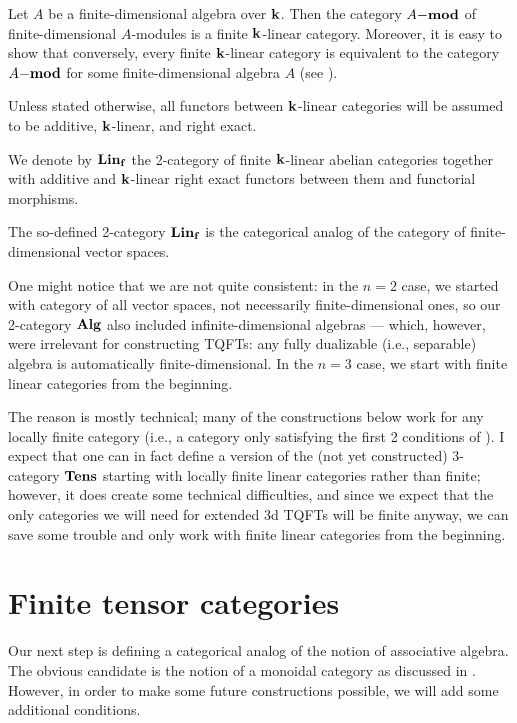 \begin{example}\label{x:finite-cat-alg}
  Let $A$ be a finite-dimensional algebra over $\kk$. Then the category $A\mod$
  of finite-dimensional $A$-modules is a finite $\kk$-linear category. Moreover,
  it is easy to show that conversely, every finite $\kk$-linear category is
  equivalent to the category $A\mod$ for some finite-dimensional algebra $A$
  (see \cite[Section~1.8]{etingof-fusion}).
\end{example}


Unless stated otherwise, all functors between $\kk$-linear categories will
be assumed to be additive, $\kk$-linear, and right exact.


\begin{definition}\label{d:linf}
  We denote by $\Linf$ the 2-category of finite $\kk$-linear abelian
  categories together with additive and $\kk$-linear right exact
  functors between them and functorial morphisms.
\end{definition}
The so-defined 2-category $\Linf$ is the categorical analog of the category of
finite-dimensional vector spaces.



\begin{remark}
  One might notice that we are not quite consistent: in the $n=2$ case, we started
  with category of all vector spaces, not necessarily finite-dimensional ones,
  so our 2-category $\Alg$ also included infinite-dimensional algebras ---
  which, however, were irrelevant for constructing TQFTs: any fully dualizable
  (i.e., separable) algebra is automatically finite-dimensional. In the $n=3$ case,
  we start with finite linear categories from the beginning.

  The reason is mostly technical; many of the constructions below work for any
  locally finite category (i.e., a category only satisfying the first 2
  conditions of ). I expect that one can in fact define a
  version of the (not yet constructed) 3-category $\Tens$ starting with
  locally finite linear categories rather than finite; however, it does create
  some technical difficulties, and since we expect that the only categories we
  will need for extended 3d TQFTs will be finite anyway, we can save some
  trouble and only work with finite linear categories from the beginning.
  \end{remark}

\section{Finite tensor categories}\label{s:tensor-categories}
Our next step is defining a categorical analog of the notion of associative
algebra. The obvious candidate is the notion of a monoidal category as
discussed in . However, in order to make some future
constructions possible, we will add some additional conditions.

